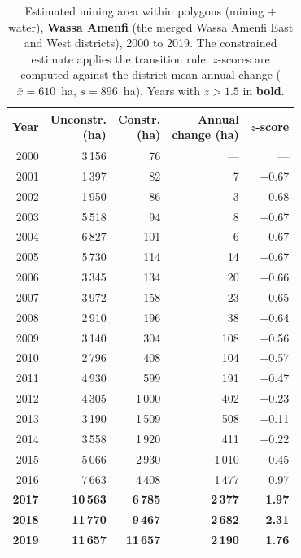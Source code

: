 \documentclass[]{interact}
\begin{document}
\begin{table}[H]
\centering
\caption{Estimated mining area within polygons (mining $+$ water), \textbf{Wassa Amenfi} (the merged Wassa Amenfi East and West districts), 2000 to 2019. The constrained estimate applies the transition rule. $z$-scores are computed against the district mean annual change ($\bar{x} = 610$~ha, $s = 896$~ha). Years with $z > 1.5$ in \textbf{bold}.}
\label{tab:district_wassa}
\small
\begin{tabular}{@{}rrrrr@{}}
\toprule
Year & \makecell[r]{Unconstr.\\(ha)} & \makecell[r]{Constr.\\(ha)} & \makecell[r]{Annual\\change (ha)} & $z$-score \\
\midrule
      2000 & 3\,156 & 76 & --- & --- \\
      2001 & 1\,397 & 82 & 7 & $-$0.67 \\
      2002 & 1\,950 & 86 & 3 & $-$0.68 \\
      2003 & 5\,518 & 94 & 8 & $-$0.67 \\
      2004 & 6\,827 & 101 & 6 & $-$0.67 \\
      2005 & 5\,730 & 114 & 14 & $-$0.67 \\
      2006 & 3\,345 & 134 & 20 & $-$0.66 \\
      2007 & 3\,972 & 158 & 23 & $-$0.65 \\
      2008 & 2\,910 & 196 & 38 & $-$0.64 \\
      2009 & 3\,140 & 304 & 108 & $-$0.56 \\
      2010 & 2\,796 & 408 & 104 & $-$0.57 \\
      2011 & 4\,930 & 599 & 191 & $-$0.47 \\
      2012 & 4\,305 & 1\,000 & 402 & $-$0.23 \\
      2013 & 3\,190 & 1\,509 & 508 & $-$0.11 \\
      2014 & 3\,558 & 1\,920 & 411 & $-$0.22 \\
      2015 & 5\,066 & 2\,930 & 1\,010 & \phantom{$-$}0.45 \\
      2016 & 7\,663 & 4\,408 & 1\,477 & \phantom{$-$}0.97 \\
      \textbf{2017} & \textbf{10\,563} & \textbf{6\,785} & \textbf{2\,377} & \textbf{\phantom{$-$}1.97} \\
      \textbf{2018} & \textbf{11\,770} & \textbf{9\,467} & \textbf{2\,682} & \textbf{\phantom{$-$}2.31} \\
      \textbf{2019} & \textbf{11\,657} & \textbf{11\,657} & \textbf{2\,190} & \textbf{\phantom{$-$}1.76} \\
\bottomrule
\end{tabular}
\end{table}
 
\end{document}
